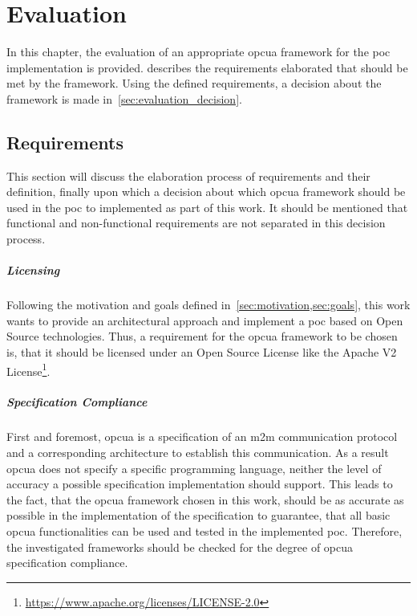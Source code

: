 \documentclass[
a4paper,
twoside,
headsepline,
cleardoublepage=empty,
parskip=half,
draft=false
]{scrbook}
\begin{document}
	\chapter{Evaluation}\label{ch:evaluation}
	
		In this chapter, the evaluation of an appropriate \gls{opcua} framework for the \gls{poc} implementation is provided.  describes the requirements elaborated that should be met by the framework. 
		Using the defined requirements, a decision about the framework is made in~\cref{sec:evaluation_decision}.
		
		\section{Requirements}\label{sec:evaluation_requirements}
		
			This section will discuss the elaboration process of requirements and their definition, finally upon which a decision about which \gls{opcua} framework should be used in the \gls{poc} to implemented as part of this work. 
			It should be mentioned that functional and non-functional requirements are not separated in this decision process.
			
			\paragraph{Licensing} Following the motivation and goals defined in~\cref{sec:motivation,sec:goals}, this work wants to provide an architectural approach and implement a \gls{poc} based on Open Source technologies.
			Thus, a requirement for the \gls{opcua} framework to be chosen is, that it should be licensed under an Open Source License like the Apache V2 License\footnote{\url{https://www.apache.org/licenses/LICENSE-2.0}}.
			
			\paragraph{Specification Compliance} First and foremost, \gls{opcua} is a specification of an \gls{m2m} communication protocol and a corresponding architecture to establish this communication. 
			As a result \gls{opcua} does not specify a specific programming language, neither the level of accuracy a possible specification implementation should support. 
			This leads to the fact, that the \gls{opcua} framework chosen in this work, should be as accurate as possible in the implementation of the specification to guarantee, that all basic \gls{opcua} functionalities can be used and tested in the implemented \gls{poc}. 
			Therefore, the investigated frameworks should be checked for the degree of \gls{opcua} specification compliance.
			
\end{document}
